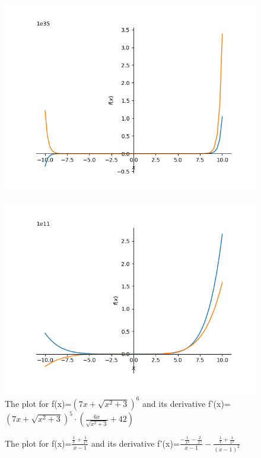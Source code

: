 \documentclass{article}
\begin{document}
\begin{figure}
\includegraphics{plot_22}
\end{figure}\begin{figure}
\caption{The plot for f(x)=$\left(7 x + \sqrt{x^{2} + 3}\right)^{6}$ and its derivative f'(x)=$\left(7 x + \sqrt{x^{2} + 3}\right)^{5} \cdot \left(\frac{6 x}{\sqrt{x^{2} + 3}} + 42\right)$}
\centering
\includegraphics{plot_23}
\end{figure}\begin{figure}
\caption{The plot for f(x)=$\frac{\frac{1}{x} + \frac{1}{x^{2}}}{x - 1}$ and its derivative f'(x)=$\frac{- \frac{1}{x^{2}} - \frac{2}{x^{3}}}{x - 1} - \frac{\frac{1}{x} + \frac{1}{x^{2}}}{\left(x - 1\right)^{2}}$}
\centering

\end{figure}
\end{document}
